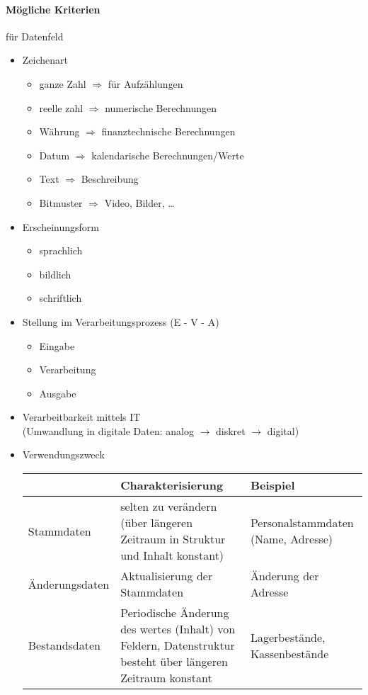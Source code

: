 \paragraph{Mögliche Kriterien} für Datenfeld
\begin{itemize}
\item Zeichenart
\begin{itemize}
\item ganze Zahl $\Rightarrow$ für Aufzählungen
\item reelle zahl $\Rightarrow$ numerische Berechnungen
\item Währung $\Rightarrow$ finanztechnische Berechnungen
\item Datum $\Rightarrow$ kalendarische Berechnungen/Werte
\item Text $\Rightarrow$ Beschreibung
\item Bitmuster $\Rightarrow$ Video, Bilder, …
\end{itemize}
\item Erscheinungsform
\begin{itemize}
\item sprachlich
\item bildlich
\item schriftlich
\end{itemize}
\item Stellung im Verarbeitungsprozess (E - V - A)
\begin{itemize}
\item Eingabe
\item Verarbeitung
\item Ausgabe
\end{itemize}
\item Verarbeitbarkeit mittels IT\\
(Umwandlung in digitale Daten: analog $\rightarrow$ diskret $\rightarrow$ digital)
\item Verwendungszweck\\
\begin{tabular}{
p{} | >{\raggedright}
p{} | >{\raggedright}
p{}}
& Charakterisierung & Beispiel\tabularnewline
\hline
Stammdaten & selten zu verändern (über längeren Zeitraum in Struktur und Inhalt konstant) & Personalstammdaten (Name, Adresse)\tabularnewline
Änderungsdaten & Aktualisierung der Stammdaten & Änderung der Adresse\tabularnewline
Bestandsdaten & Periodische Änderung des wertes (Inhalt) von Feldern, Datenstruktur besteht über längeren Zeitraum konstant & Lagerbestände, Kassenbestände\tabularnewline

\end{tabular}
\end{itemize}
